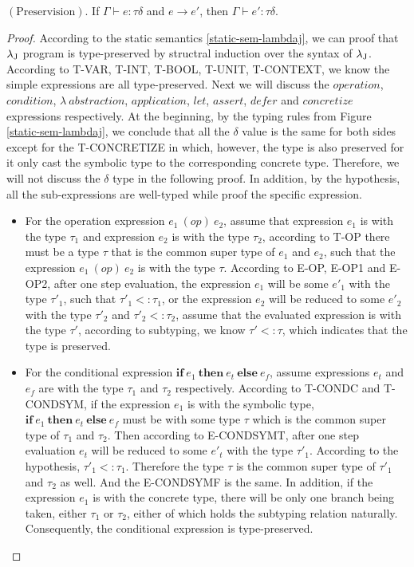     \begin{theorem}
        $\mathrm{(Preservision).}$ If $\Gamma\vdash e:\tau\delta$ and $e\rightarrow e'$, then $\Gamma\vdash e':\tau\delta$. 
    \end{theorem}
    \begin{proof}
        According to the static semantics \ref{static-sem-lambdaj}, we can proof that ${\lambda_{\text{J}}}$ program is type-preserved by structral induction over the syntax of ${\lambda_{\text{J}}}$. According to T-VAR, T-INT, T-BOOL, T-UNIT, T-CONTEXT, we know the simple expressions are all type-preserved. Next we will discuss the $operation$, $condition$, $\lambda~ abstraction$, $application$, $let$, $assert$, $defer$ and $concretize$ expressions respectively. At the beginning, by the typing rules from Figure \ref{static-sem-lambdaj}, we conclude that all the $\delta$ value is the same for both sides except for the T-CONCRETIZE in which, however, the type is also preserved for it only cast the symbolic type to the corresponding concrete type. Therefore, we will not discuss the $\delta$ type in the following proof. In addition, by the hypothesis, all the sub-expressions are well-typed while proof the specific expression.
        \begin{itemize}
            \item For the operation expression $e_1~(op)~e_2$, assume that expression $e_1$ is with the type $\tau_1$ and expression $e_2$ is with the type $\tau_2$, according to T-OP there must be a type $\tau$ that is the common super type of $e_1$ and $e_2$, such that the expression $e_1~(op)~e_2$ is with the type $\tau$. According to E-OP, E-OP1 and E-OP2, after one step evaluation, the expression $e_1$ will be some $e'_1$ with the type $\tau'_1$, such that $\tau'_1<:\tau_1$, or the expression $e_2$  will be reduced to some $e'_2$ with the type $\tau'_2$ and $\tau'_2<:\tau_2$, assume that the evaluated expression is with the type $\tau'$, according to subtyping, we know $\tau'<:\tau$, which indicates that the type is preserved.
            \item For the conditional expression $\textbf{if}~e_1~\textbf{then}~e_t~\textbf{else}~e_f$, assume expressions $e_t$ and $e_f$ are with the type $\tau_1$ and $\tau_2$ respectively. According to T-CONDC and T-CONDSYM, if the expression $e_1$ is with the symbolic type, $\textbf{if}~e_1~\textbf{then}~e_t~\textbf{else}~e_f$ must be with some type $\tau$ which is the common super type of $\tau_1$ and $\tau_2$. Then according to E-CONDSYMT, after one step evaluation $e_t$ will be reduced to some $e'_t$ with the type $\tau'_1$. According to the hypothesis, $\tau'_1<:\tau_1$. Therefore the type $\tau$ is the common super type of $\tau'_1$ and $\tau_2$ as well. And the E-CONDSYMF is the same. In addition, if the expression $e_1$ is with the concrete type, there will be only one branch being taken, either $\tau_1$ or $\tau_2$, either of which holds the subtyping relation  naturally. Consequently, the conditional expression is type-preserved.

\end{itemize}
\end{proof}
